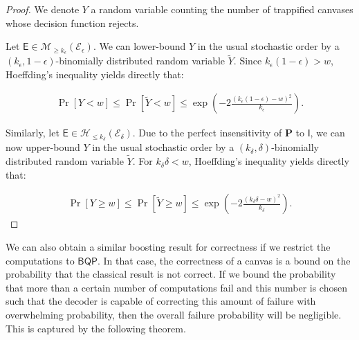 \documentclass[12pt]{iopart}
\newcommand{\cptp}[1]{\mathsf{#1}} \newcommand{\pd}[1]{\mathcal{#1}}  \newcommand{\sch}[1]{\bm{#1}}
\newcommand{\Id}{\cptp{I}}
\renewcommand{\1}{\mathds{1}}
\begin{document}
\begin{proof}

We denote $Y$ a random variable counting the number of trappified canvases whose decision function rejects.

Let $\cptp E \in \mathcal{M}_{\geq k_\epsilon}(\mathcal{E}_\epsilon)$. We can lower-bound $Y$ in the usual stochastic order by a $(k_\epsilon, 1 - \epsilon)$-binomially distributed random variable $\tilde{Y}$. Since $k_\epsilon(1-\epsilon) > w$, Hoeffding's inequality yields directly that:

\begin{align}
	\Pr[Y < w] \leq \Pr[\tilde{Y} < w] \leq \exp \left( -2 \frac{(k_\epsilon (1 - \epsilon) - w)^2}{k_\epsilon} \right).
\end{align}

Similarly, let $\cptp E \in \mathcal{H}_{\leq k_\delta}(\mathcal{E}_\delta)$. Due to the perfect insensitivity of $\sch P$ to $\Id$, we can now upper-bound $Y$ in the usual stochastic order by a $(k_\delta, \delta)$-binomially distributed random variable $\tilde{Y}$. For $k_\delta\delta < w$, Hoeffding's inequality yields directly that:

\begin{align}
	\Pr[Y \geq w] \leq \Pr[\tilde{Y} \geq w] \leq \exp \left( -2 \frac{(k_\delta\delta - w)^2}{k_\delta} \right).
\end{align}

\end{proof}

We can also obtain a similar boosting result for correctness if we restrict the computations to $\mathsf{BQP}$. In that case, the correctness of a canvas is a bound on the probability that the classical result is not correct. If we bound the probability that more than a certain number of computations fail and this number is chosen such that the decoder is capable of correcting this amount of failure with overwhelming probability, then the overall failure probability will be negligible. This is captured by the following theorem.
\end{document}
